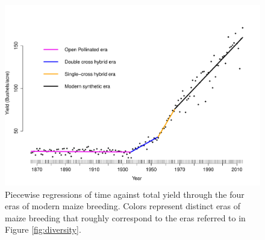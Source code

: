 \documentclass[12pt]{article}
\begin{document}
\begin{figure}
\includegraphics[width=0.6\linewidth]{yield.pdf}
\caption{Piecewise regressions of time against total yield through the four eras of modern maize breeding. Colors represent distinct eras of maize breeding that roughly correspond to the eras  referred to in Figure \ref{fig:diversity}.} 
\label{fig:piecewise}
\end{figure}

%
 
%

\end{document}
